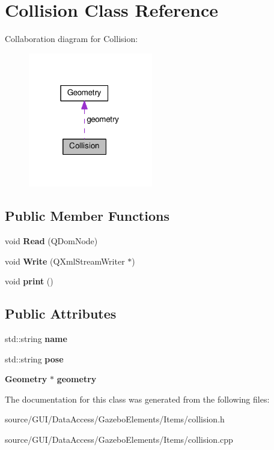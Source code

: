 \section{Collision Class Reference}
\label{class_collision}


Collaboration diagram for Collision\+:\nopagebreak
\begin{figure}[H]
\begin{center}
\leavevmode
\includegraphics[width=154pt]{class_collision__coll__graph}
\end{center}
\end{figure}
\subsection*{Public Member Functions}
\begin{DoxyCompactItemize}
\item 
void {\bfseries Read} (Q\+Dom\+Node)\label{class_collision_a49baaedd2fcb5bb9b35e61bea03af4ee}

\item 
void {\bfseries Write} (Q\+Xml\+Stream\+Writer $\ast$)\label{class_collision_aa3e2d3e4fe5f7b95621686a6abd34b41}

\item 
void {\bfseries print} ()\label{class_collision_ae13b2020e4a981b39eb83bf3495fcc3e}

\end{DoxyCompactItemize}
\subsection*{Public Attributes}
\begin{DoxyCompactItemize}
\item 
std\+::string {\bfseries name}\label{class_collision_a9b93e3fd9327f5201685f6173fac3524}

\item 
std\+::string {\bfseries pose}\label{class_collision_a209fce74f4031372375f56a6093c5af5}

\item 
{\bf Geometry} $\ast$ {\bfseries geometry}\label{class_collision_ada589b48478a35cfb3c68c39e6f8972f}

\end{DoxyCompactItemize}


The documentation for this class was generated from the following files\+:\begin{DoxyCompactItemize}
\item 
source/\+G\+U\+I/\+Data\+Access/\+Gazebo\+Elements/\+Items/collision.\+h\item 
source/\+G\+U\+I/\+Data\+Access/\+Gazebo\+Elements/\+Items/collision.\+cpp\end{DoxyCompactItemize}
